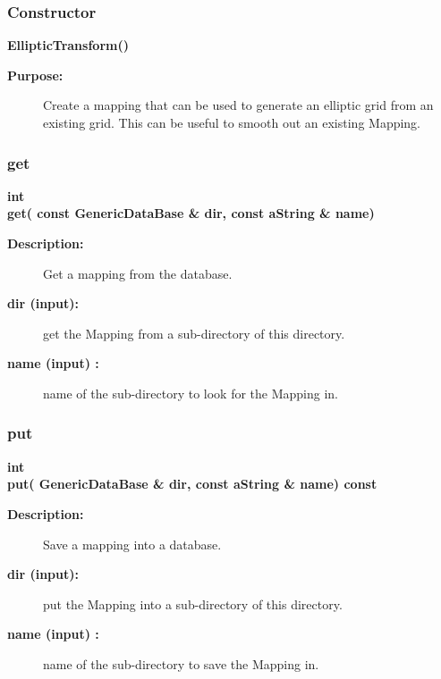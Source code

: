 \subsubsection{Constructor}
 
\newlength{\EllipticTransformIncludeArgIndent}
\begin{flushleft} \textbf{%
\settowidth{\EllipticTransformIncludeArgIndent}{EllipticTransform(}%
EllipticTransform() 
}\end{flushleft}
\begin{description}
\item[{\bf Purpose:}]  
    Create a mapping that can be used to generate an elliptic grid
   from an existing grid. This can be useful to smooth out an existing Mapping.
 
\end{description}
\subsubsection{get}
 
\begin{flushleft} \textbf{%
int  \\ 
\settowidth{\EllipticTransformIncludeArgIndent}{get(}%
get( const GenericDataBase \& dir, const aString \& name)
}\end{flushleft}
\begin{description}
\item[{\bf Description:}] 
    Get a mapping from the database.
\item[{\bf dir (input):}]  get the Mapping from a sub-directory of this directory.
\item[{\bf name (input) :}]  name of the sub-directory to look for the Mapping in.
\end{description}
\subsubsection{put}
 
\begin{flushleft} \textbf{%
int  \\ 
\settowidth{\EllipticTransformIncludeArgIndent}{put(}%
put( GenericDataBase \& dir, const aString \& name) const
}\end{flushleft}
\begin{description}
\item[{\bf Description:}] 
    Save a mapping into a database.
\item[{\bf dir (input):}]  put the Mapping into a sub-directory of this directory.
\item[{\bf name (input) :}]  name of the sub-directory to save the Mapping in.
\end{description}
